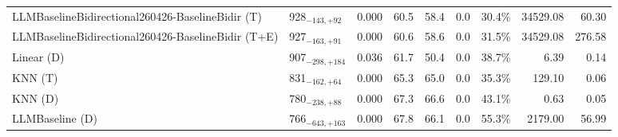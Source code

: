 \begin{tabular}{llcccccrr}
LLMBaselineBidirectional260426-BaselineBidir (T) & 928${}_{-143,+92}$ & 0.000 & 60.5 & 58.4 & 0.0 & 30.4\% & 34529.08 & 60.30 \\
LLMBaselineBidirectional260426-BaselineBidir (T+E) & 927${}_{-163,+91}$ & 0.000 & 60.6 & 58.6 & 0.0 & 31.5\% & 34529.08 & 276.58 \\
Linear (D) & 907${}_{-298,+184}$ & 0.036 & 61.7 & 50.4 & 0.0 & 38.7\% & 6.39 & 0.14 \\
KNN (T) & 831${}_{-162,+64}$ & 0.000 & 65.3 & 65.0 & 0.0 & 35.3\% & 129.10 & 0.06 \\
KNN (D) & 780${}_{-238,+88}$ & 0.000 & 67.3 & 66.6 & 0.0 & 43.1\% & 0.63 & 0.05 \\
LLMBaseline (D) & 766${}_{-643,+163}$ & 0.000 & 67.8 & 66.1 & 0.0 & 55.3\% & 2179.00 & 56.99 \\
\bottomrule
\end{tabular}